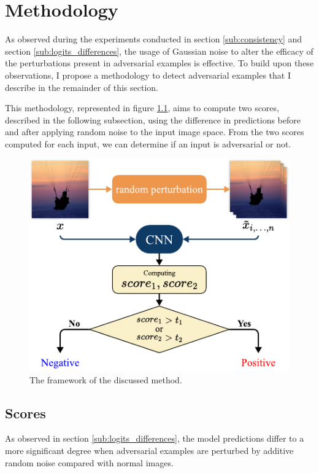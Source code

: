 \chapter{Methodology}
\label{Methodology}
\overridetextsize


As observed during the experiments conducted in section \ref{sub:consistency}
and section \ref{sub:logits_differences}, the usage of Gaussian noise to alter
the efficacy of the perturbations present in adversarial examples is effective.
To build upon these observations, I propose a methodology to detect adversarial
examples that I describe in the remainder of this section.

This methodology, represented in figure \ref{fig:framework}, aims to compute two
scores, described in the following subsection, using the difference in
predictions before and after applying random noise to the input image space.
From the two scores computed for each input, we can determine if an input is
adversarial or not.

\begin{figure}[htp]
    \includegraphics[clip,width=\columnwidth]{Figures/methodology/Framework.pdf}%

    \caption{The framework of the discussed method.}
    \label{fig:framework}
\end{figure}

\section{Scores}
\label{sub:detection_metrics}
As observed in section \ref{sub:logits_differences}, the model predictions
differ to a more significant degree when adversarial examples are perturbed by
additive random noise compared with normal images.

